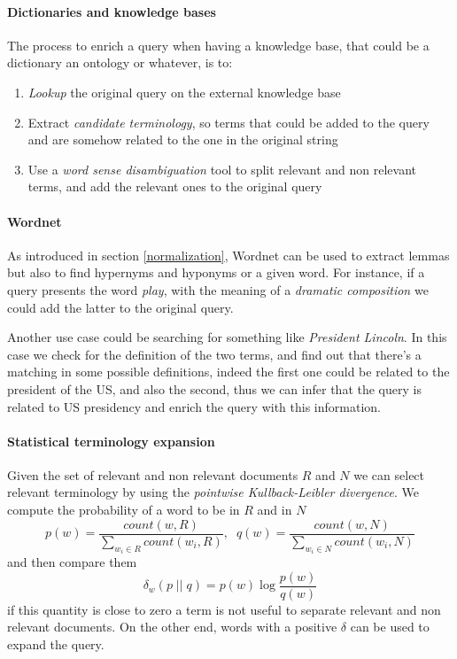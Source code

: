 \paragraph{Dictionaries and knowledge bases}
The process to enrich a query when having a knowledge base, that could 
be a dictionary an ontology or whatever, is to:
\begin{enumerate}
    \item \emph{Lookup} the original query on the external knowledge base
    \item Extract \emph{candidate terminology}, so terms that could be added 
    to the query and are somehow related to the one in the original string
    \item Use a \emph{word sense disambiguation} tool to split relevant and 
    non relevant terms, and add the relevant ones to the original
    query
\end{enumerate}

\paragraph{Wordnet}
As introduced in section \vref{normalization}, Wordnet can be used to extract 
lemmas but also to find hypernyms and hyponyms or a given word. For instance, 
if a query presents the word \emph{play}, with the meaning of a 
\emph{dramatic composition} we could add the latter to the original query.

Another use case could be searching for something like \emph{President Lincoln}.
In this case we check for the definition of the two terms, and find 
out that there's a matching in some possible definitions, indeed the first one 
could be related to the president of the US, and also the second, thus we can 
infer that the query is related to US presidency and enrich the query with this 
information.

\paragraph{Statistical terminology expansion}
Given the set of relevant and non relevant documents $R$ and $N$ we can select 
relevant terminology by using the \emph{pointwise Kullback-Leibler divergence}.
We compute the probability of a word  to be in $R$ and in $N$
$$p(w) = \frac{\mathit{count}(w, R)}{\sum_{w_i \in R}\mathit{count}(w_i, R)},\;\;
q(w) = \frac{\mathit{count}(w, N)}{\sum_{w_i \in N}\mathit{count}(w_i, N)}$$
and then compare them 
$$\delta_w(p\;||\;q) = p(w)\log\frac{p(w)}{q(w)}$$
if this quantity is close to zero a term is not useful to separate relevant and non 
relevant documents. On the other end, words with a positive $\delta$ can be used 
to expand the query.

